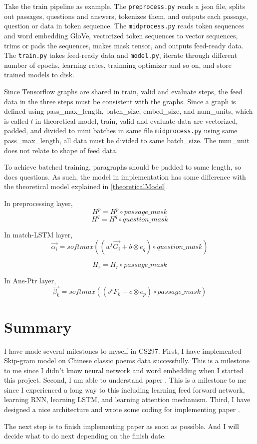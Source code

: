 \documentclass[12pt]{article}
\begin{document}
Take the train pipeline as example. The \texttt{preprocess.py} reads a json file, splits out passages, questions and answers, tokenizes them, and outputs each passage, question or data in token sequence. The \texttt{midprocess.py} reads token sequences and word embedding GloVe, vectorized token sequences to vector sequences, trims or pads the sequences, makes mask tensor, and outputs feed-ready data. The \texttt{train.py} takes feed-ready data and \texttt{model.py}, iterate through different number of epochs, learning rates, trainning optimizer and so on, and store trained models to disk.


Since Tensorflow graphs are shared in train, valid and evaluate steps, the feed data in the three steps must be consistent with the graphs. Since a graph is defined using pass\_max\_length, batch\_size, embed\_size, and  num\_units, which is called $l$ in theoretical model, train, valid and evaluate data are vectorized, padded, and divided to mini batches in same file \texttt{midprocess.py} using same pass\_max\_length, all data must be divided to same batch\_size. The num\_unit does not relate to shape of feed data.


To achieve batched training, paragraphs should be padded to same length, so does questions. As such, the model in implementation has some difference with the theoretical model explained in \ref{theoreticalModel}.

In preprocessing layer,
$$H^p = H^p \circ passage\_mask$$
$$H^q = H^q \circ question\_mask$$

In match-LSTM layer,
$$\overrightarrow{\alpha _i} = softmax( (w^t\overrightarrow{G_i} + b \otimes e_q) \circ question\_mask)$$


$$H_r = H_r \circ passage\_mask$$

In Ans-Ptr layer,
$$\overrightarrow{\beta _k} = softmax( (v^tF_k + c \otimes e_p) \circ passage\_mask)$$

\break

\section{Summary}\label{sec:summary}

I have made several milestones to myself in CS297. First, I have implemented Skip-gram model on Chinese classic poems data successfully. This is a milestone to me since I didn't know neural network and word embedding when I started this project. Second, I am able to understand paper \cite{wang2016machine}. This is a milestone to me since I experienced a long way to this including learning feed forward network, learning RNN, learning LSTM, and  learning attention mechanism. Third, I have designed a nice architecture and wrote some coding for implementing paper \cite{wang2016machine}.

The next step is to finish implementing paper \cite{wang2016machine} as soon as possible. And I will decide what to do next depending on the finish date.

\break



\printbibliography[heading=bibintoc,title={References}]
\end{document}
